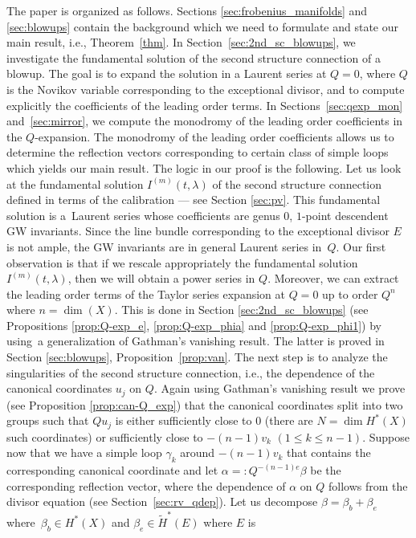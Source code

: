\documentclass[10pt,a4paper]{article}
\numberwithin{equation}{section}
\begin{document}
The paper is organized as follows. Sections
\ref{sec:frobenius_manifolds} and \ref{sec:blowups} contain the
background which we need to formulate and state our main result, i.e.,
Theorem~\ref{thm}. In Section~\ref{sec:2nd_sc_blowups}, we investigate
the fundamental solution of the second structure connection of a
blowup. The goal is to expand the solution in a Laurent series at
$Q=0$, where $Q$ is the Novikov variable corresponding to the
exceptional divisor,
and to compute explicitly the coefficients of the leading order terms.
In Sections~\ref{sec:qexp_mon} and~\ref{sec:mirror}, we compute the
monodromy of the leading order coefficients in the $Q$-expansion. The
monodromy of the leading order coefficients allows us to determine the
reflection vectors corresponding to certain class of simple loops
which yields our main result. The logic in our proof is the
following. Let us look at the fundamental solution
$I^{(m)}(t,\lambda)$ of the second structure connection defined in
terms of the calibration --- see Section \ref{sec:pv}. This fundamental
solution is a~Laurent series whose coefficients are genus $0$,
$1$-point descendent GW invariants. Since the line bundle corresponding to the exceptional divisor $E$ is not ample, the
GW invariants are in general Laurent series in~$Q$. Our first
observation is that if we rescale appropriately the fundamental
solution $I^{(m)}(t,\lambda)$, then we will obtain a power series in
$Q$. Moreover, we can extract the leading order terms of the Taylor
series expansion at $Q=0$ up to order $Q^n$ where
${n=\operatorname{dim}(X)}$. This is done in Section
\ref{sec:2nd_sc_blowups} (see Propositions \ref{prop:Q-exp_e},
\ref{prop:Q-exp_phia} and \ref{prop:Q-exp_phi1}) by using~a
generalization of Gathman's vanishing result. The latter is proved in
Section \ref{sec:blowups}, Proposition~\ref{prop:van}. The next step
is to analyze the singularities of the second structure connection,
i.e., the dependence of the canonical coordinates $u_j$ on $Q$. Again
using Gathman's vanishing result we prove (see Proposition
\ref{prop:can-Q_exp}) that the canonical coordinates split into two
groups such that $Qu_j$ is either sufficiently close to $0$ (there are
$N=\operatorname{dim}H^*(X)$ such coordinates) or sufficiently close
to $-(n-1)v_k$ $(1\leq k\leq n-1)$. Suppose now that we have a simple
loop $\gamma_k$ around $ -(n-1)v_k$ that contains the corresponding
canonical coordinate and let $\alpha=: Q^{-(n-1)e}\beta $ be the
corresponding reflection vector, where the dependence of $\alpha$ on
$Q$ follows from the divisor equation (see Section~\ref{sec:rv_qdep}). Let us decompose $\beta=\beta_b+\beta_e$ where~$\beta_b \in H^*(X)$ and $\beta_e\in \widetilde{H}^*(E)$ where $E$ is
\end{document}
